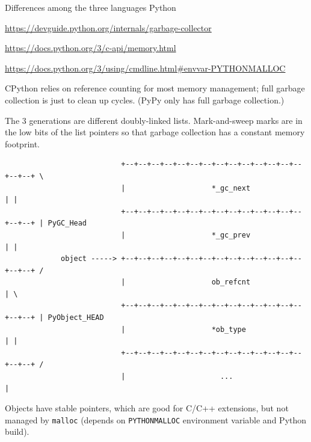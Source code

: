 \documentclass[aspectratio=169]{beamer}
\begin{document}
\begin{frame}[fragile]{Differences among the three languages}
\vspace{0.1 cm}
\Huge
Python \hfill {\tiny \begin{minipage}{0.7\linewidth}\hfill \textcolor{blue}{\url{https://devguide.python.org/internals/garbage-collector}}

\hfill \textcolor{blue}{\url{https://docs.python.org/3/c-api/memory.html}}

\hfill \textcolor{blue}{\url{https://docs.python.org/3/using/cmdline.html\#envvar-PYTHONMALLOC}}\end{minipage}}

\vspace{0.25 cm}
\normalsize
CPython relies on reference counting for most memory management; full garbage collection is just to clean up cycles. (PyPy only has full garbage collection.)

\vspace{0.2 cm}
The 3 generations are different doubly-linked lists. Mark-and-sweep marks are in the low bits of the list pointers so that garbage collection has a constant memory footprint.

\tiny
\begin{verbatim}
                           +--+--+--+--+--+--+--+--+--+--+--+--+--+--+--+--+ \
                           |                    *_gc_next                  | |
                           +--+--+--+--+--+--+--+--+--+--+--+--+--+--+--+--+ | PyGC_Head
                           |                    *_gc_prev                  | |
             object -----> +--+--+--+--+--+--+--+--+--+--+--+--+--+--+--+--+ /
                           |                    ob_refcnt                  | \
                           +--+--+--+--+--+--+--+--+--+--+--+--+--+--+--+--+ | PyObject_HEAD
                           |                    *ob_type                   | |
                           +--+--+--+--+--+--+--+--+--+--+--+--+--+--+--+--+ /
                           |                      ...                      |
\end{verbatim}

\normalsize
Objects have stable pointers, which are good for C/C++ extensions, but not managed by \texttt{malloc} (depends on \texttt{PYTHONMALLOC} environment variable and Python build).
\end{frame}
\end{document}

